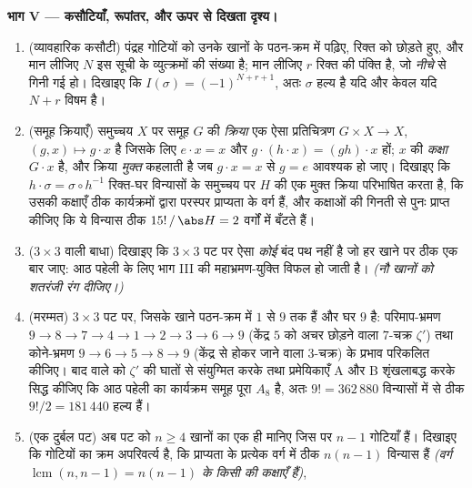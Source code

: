 \begin{problem}
\medskip
\noindent\textbf{भाग V --- कसौटियाँ, रूपांतर, और ऊपर से दिखता दृश्य।}
\begin{enumerate}[resume]
  \item (व्यावहारिक कसौटी) पंद्रह गोटियों को उनके खानों के पठन-क्रम
        में पढ़िए, रिक्त को छोड़ते हुए, और मान लीजिए $N$ इस सूची के
        व्युत्क्रमों की संख्या है; मान लीजिए $r$ रिक्त की पंक्ति है,
        जो \emph{नीचे} से गिनी गई हो। दिखाइए कि $I(\sigma) = (-1)^{N + r + 1}$, अतः $\sigma$ हल्य है
        यदि और केवल यदि $N + r$ विषम है।
  \item (समूह क्रियाएँ) समुच्चय $X$ पर समूह $G$ की \emph{क्रिया} एक
        ऐसा प्रतिचित्रण $G \times X \to X$, $(g, x) \mapsto g \cdot
        x$ है जिसके लिए $e \cdot x = x$ और $g \cdot (h \cdot x) =
        (gh) \cdot x$ हों; $x$
        की \emph{कक्षा} $G \cdot x$ है, और क्रिया \emph{मुक्त} कहलाती है जब
        $g \cdot x = x$ से $g =
        e$ आवश्यक हो जाए। दिखाइए कि $h \cdot \sigma = \sigma \circ h^{-1}$ रिक्त-घर विन्यासों
        के समुच्चय पर $H$ की एक मुक्त क्रिया परिभाषित करता है, कि
        उसकी कक्षाएँ ठीक कार्यक्रमों द्वारा परस्पर प्राप्यता के वर्ग
        हैं, और कक्षाओं की गिनती से पुनः प्राप्त कीजिए कि ये विन्यास
        ठीक $15!\,/\,\abs H = 2$ वर्गों में बँटते हैं।
  \item ($3 \times 3$ वाली बाधा) दिखाइए कि $3 \times 3$ पट पर ऐसा \emph{कोई} बंद पथ
        नहीं है जो हर खाने पर ठीक एक बार जाए: आठ पहेली के लिए भाग III
        की महाभ्रमण-युक्ति विफल हो जाती है। \emph{(नौ खानों को शतरंजी
        रंग दीजिए।)}
  \item (मरम्मत) $3 \times 3$ पट पर, जिसके खाने पठन-क्रम में $1$ से $9$ तक
        हैं और घर $9$ है: परिमाप-भ्रमण $9 \to 8 \to 7 \to 4 \to 1 \to 2 \to 3
        \to 6 \to 9$ (केंद्र $5$ को अचर
        छोड़ने वाला $7$-चक्र $\zeta'$) तथा कोने-भ्रमण $9 \to 6 \to 5 \to 8 \to 9$ (केंद्र से
        होकर जाने वाला $3$-चक्र) के प्रभाव परिकलित कीजिए। बाद वाले
        को $\zeta'$ की घातों से संयुग्मित करके तथा प्रमेयिकाएँ A और B
        शृंखलाबद्ध करके सिद्ध कीजिए कि आठ पहेली का कार्यक्रम समूह पूरा
        $A_8$ है, अतः $9! =
        362\,880$ विन्यासों में से ठीक $9!/2 = 181\,440$ हल्य हैं।
  \item (एक दुर्बल पट) अब पट को $n
        \geq 4$ खानों का एक ही  मानिए जिस पर
        $n - 1$ गोटियाँ हैं। दिखाइए कि गोटियों का  क्रम अपरिवर्त्य
        है, कि प्राप्यता के प्रत्येक वर्ग में ठीक $n(n - 1)$ विन्यास हैं
        \emph{(वर्ग  $\operatorname{lcm}(n, n-1) = n(n-1)$ के किसी  की कक्षाएँ हैं)},

\end{enumerate}
\end{problem}
